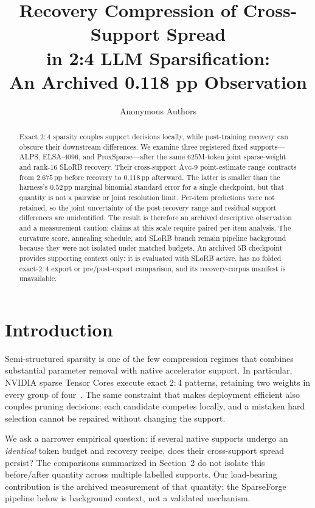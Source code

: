 \documentclass{article}
\title{Recovery Compression of Cross-Support Spread\\ in 2:4 LLM Sparsification:\\ An Archived 0.118 pp Observation}
\author{Anonymous Authors}
\newcommand{\taskavg}{\textsc{Avg}-9}
\begin{document}
\maketitle

\begin{abstract}
Exact $2{:}4$ sparsity couples support decisions locally, while post-training recovery can obscure
their downstream differences. We examine three registered fixed supports---ALPS, ELSA-4096, and
ProxSparse---after the same $625$M-token joint sparse-weight and rank-16 SLoRB recovery. Their
cross-support \taskavg{} point-estimate range contracts from $2.675$\,pp before recovery to
$0.118$\,pp afterward. The latter is smaller than the harness's $0.52$\,pp marginal binomial
standard error for a single checkpoint, but that quantity is not a pairwise or joint resolution
limit. Per-item predictions were not retained, so the joint uncertainty of the post-recovery range
and residual support differences are unidentified. The result is therefore an archived descriptive
observation and a measurement caution: claims at this scale require paired per-item analysis. The
curvature score, annealing schedule, and SLoRB branch remain pipeline background because they were
not isolated under matched budgets. An archived $5$B checkpoint provides supporting context only:
it is evaluated with SLoRB active, has no folded exact-$2{:}4$ export or pre/post-export comparison,
and its recovery-corpus manifest is unavailable.
\end{abstract}

\section{Introduction}
Semi-structured sparsity is one of the few compression regimes that combines substantial parameter removal with native accelerator support. In particular, NVIDIA sparse Tensor Cores execute exact $2{:}4$ patterns, retaining two weights in every group of four~\citep{nvidia2020ampere}. The same constraint that makes deployment efficient also couples pruning decisions: each candidate competes locally, and a mistaken hard selection cannot be repaired without changing the support.

We ask a narrower empirical question: if several native supports undergo an \emph{identical} token
budget and recovery recipe, does their cross-support spread persist? The comparisons summarized in
Section~2 do not isolate this before/after quantity across multiple labelled supports. Our
load-bearing contribution is the archived measurement of that quantity; the SparseForge pipeline
below is background context, not a validated mechanism.
\end{document}
